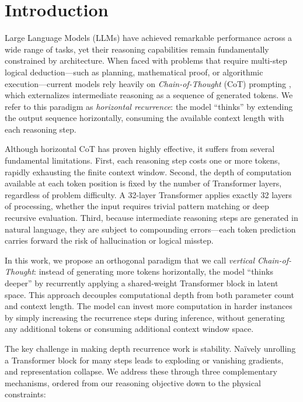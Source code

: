 \section{Introduction}\label{sec:intro}

Large Language Models (LLMs) have achieved remarkable performance across a wide range of tasks, yet their reasoning capabilities remain fundamentally constrained by architecture. When faced with problems that require multi-step logical deduction---such as planning, mathematical proof, or algorithmic execution---current models rely heavily on \emph{Chain-of-Thought} (CoT) prompting \citep{wei2022chain}, which externalizes intermediate reasoning as a sequence of generated tokens. We refer to this paradigm as \emph{horizontal recurrence}: the model ``thinks'' by extending the output sequence horizontally, consuming the available context length with each reasoning step.
 
Although horizontal CoT has proven highly effective, it suffers from several fundamental limitations. First, each reasoning step costs one or more tokens, rapidly exhausting the finite context window. Second, the depth of computation available at each token position is fixed by the number of Transformer layers, regardless of problem difficulty. A 32-layer Transformer applies exactly 32 layers of processing, whether the input requires trivial pattern matching or deep recursive evaluation. Third, because intermediate reasoning steps are generated in natural language, they are subject to compounding errors---each token prediction carries forward the risk of hallucination or logical misstep.
 
In this work, we propose an orthogonal paradigm that we call \emph{vertical Chain-of-Thought}: instead of generating more tokens horizontally, the model ``thinks deeper'' by recurrently applying a shared-weight Transformer block in latent space. This approach decouples computational depth from both parameter count and context length. The model can invest more computation in harder instances by simply increasing the recurrence steps during inference, without generating any additional tokens or consuming additional context window space.
 
The key challenge in making depth recurrence work is stability. Na\"ively unrolling a Transformer block for many steps leads to exploding or vanishing gradients, and representation collapse. We address these through three complementary mechanisms, ordered from our reasoning objective down to the physical constraints:
 
